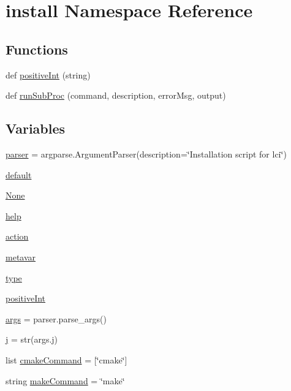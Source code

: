 \hypertarget{namespaceinstall}{}\section{install Namespace Reference}
\label{namespaceinstall}
\subsection*{Functions}
\begin{DoxyCompactItemize}
\item 
def \hyperlink{namespaceinstall_a322a65573b48799208f0c1465a283d07}{positive\+Int} (string)
\item 
def \hyperlink{namespaceinstall_ace4411f334d06fa0f3435c68f7f99d7b}{run\+Sub\+Proc} (command, description, error\+Msg, output)
\end{DoxyCompactItemize}
\subsection*{Variables}
\begin{DoxyCompactItemize}
\item 
\hyperlink{namespaceinstall_abc452e1fa01635990639b0504ec27ae7}{parser} = argparse.\+Argument\+Parser(description=\char`\"{}Installation script for lci\char`\"{})
\item 
\hyperlink{namespaceinstall_ab228126c41a0d7c8f1d21cf604f91890}{default}
\item 
\hyperlink{namespaceinstall_aa4d19a093a7a80f44505c37e43c9476f}{None}
\item 
\hyperlink{namespaceinstall_a0a780efa5038656e66ea8f9523ad796c}{help}
\item 
\hyperlink{namespaceinstall_a382cf64d978727b7a590c4c456d5941d}{action}
\item 
\hyperlink{namespaceinstall_a884d816403ea7a172c525ebcbeaf2298}{metavar}
\item 
\hyperlink{namespaceinstall_af9668ace3847cc3067a9ed9f308c7cb4}{type}
\item 
\hyperlink{namespaceinstall_a1ec47a052cf038d0bfc15b0a0749c55a}{positive\+Int}
\item 
\hyperlink{namespaceinstall_ab405fc738dba34da80eb1b2a78493e69}{args} = parser.\+parse\+\_\+args()
\item 
\hyperlink{namespaceinstall_aae13e31bbc0bae63a8b13fa301e6f0f5}{j} = str(args.\+j)
\item 
list \hyperlink{namespaceinstall_a5e53d1efb55942e4504f55900468d19c}{cmake\+Command} = \mbox{[}\char`\"{}cmake\char`\"{}\mbox{]}
\item 
string \hyperlink{namespaceinstall_a0afded8b3487dc7bd9e6298e39cc80bf}{make\+Command} = \char`\"{}make\char`\"{}
\end{DoxyCompactItemize}


